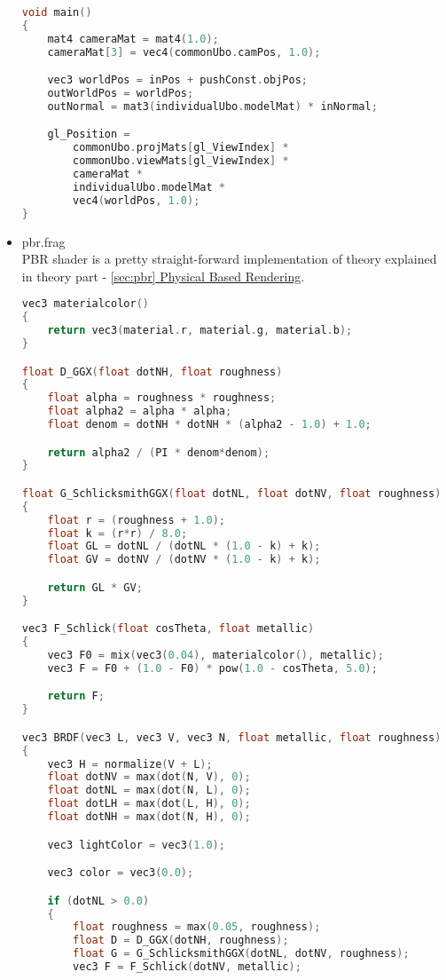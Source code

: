 \begin{itemize}
\begin{lstlisting}[language=c++, caption=PBR vertex shader(./assets/shaders/pbr.vert)]
void main()
{
    mat4 cameraMat = mat4(1.0);
    cameraMat[3] = vec4(commonUbo.camPos, 1.0);

    vec3 worldPos = inPos + pushConst.objPos;
    outWorldPos = worldPos;
    outNormal = mat3(individualUbo.modelMat) * inNormal;

    gl_Position =
        commonUbo.projMats[gl_ViewIndex] *
        commonUbo.viewMats[gl_ViewIndex] *
        cameraMat *
        individualUbo.modelMat *
        vec4(worldPos, 1.0);
}
\end{lstlisting}
    \item pbr.frag\\
    PBR shader is a pretty straight-forward implementation of theory explained in theory part - \hyperref[sec:pbr]{\ref*{sec:pbr} Physical Based Rendering}.
\begin{lstlisting}[language=c++, caption=PBR fragment shader(./assets/shaders/pbr.frag)]
vec3 materialcolor()
{
    return vec3(material.r, material.g, material.b);
}

float D_GGX(float dotNH, float roughness)
{
    float alpha = roughness * roughness;
    float alpha2 = alpha * alpha;
    float denom = dotNH * dotNH * (alpha2 - 1.0) + 1.0;

    return alpha2 / (PI * denom*denom);
}

float G_SchlicksmithGGX(float dotNL, float dotNV, float roughness)
{
    float r = (roughness + 1.0);
    float k = (r*r) / 8.0;
    float GL = dotNL / (dotNL * (1.0 - k) + k);
    float GV = dotNV / (dotNV * (1.0 - k) + k);

    return GL * GV;
}

vec3 F_Schlick(float cosTheta, float metallic)
{
    vec3 F0 = mix(vec3(0.04), materialcolor(), metallic);
    vec3 F = F0 + (1.0 - F0) * pow(1.0 - cosTheta, 5.0);

    return F;
}

vec3 BRDF(vec3 L, vec3 V, vec3 N, float metallic, float roughness)
{
    vec3 H = normalize(V + L);
    float dotNV = max(dot(N, V), 0);
    float dotNL = max(dot(N, L), 0);
    float dotLH = max(dot(L, H), 0);
    float dotNH = max(dot(N, H), 0);

    vec3 lightColor = vec3(1.0);

    vec3 color = vec3(0.0);

    if (dotNL > 0.0)
    {
        float roughness = max(0.05, roughness);
        float D = D_GGX(dotNH, roughness);
        float G = G_SchlicksmithGGX(dotNL, dotNV, roughness);
        vec3 F = F_Schlick(dotNV, metallic);


\end{lstlisting}
\end{itemize}
